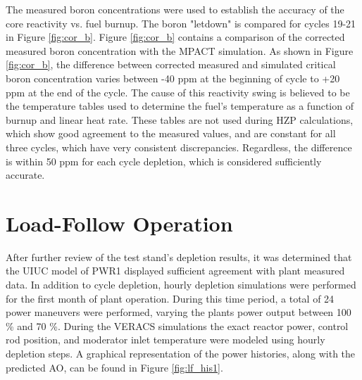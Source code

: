 \documentclass[edeposit,fullpage,11pt]{uiucthesis2009}
\begin{document}
The measured boron concentrations were used to establish the accuracy of the core reactivity vs. fuel burnup. 
The boron "letdown" is compared for cycles 19-21 in Figure \ref{fig:cor_b}. 
Figure \ref{fig:cor_b} contains a comparison of the corrected measured boron concentration with the MPACT simulation. 
As shown in Figure \ref{fig:cor_b}, the difference between corrected measured and simulated critical boron concentration varies between -40 ppm at the beginning of cycle to +20 ppm at the end of the cycle. 
The cause of this reactivity swing is believed to be the temperature tables used to determine the fuel's temperature as a function of burnup and linear heat rate.
These tables are not used during \gls{HZP} calculations, which show good agreement to the measured values, and are constant for all three cycles, which have very consistent discrepancies.
Regardless, the difference is within 50 ppm for each cycle depletion, which is considered sufficiently accurate.

\section{Load-Follow Operation}

After further review of the test stand's depletion results, it was determined that the \gls{UIUC} model of PWR1 displayed sufficient agreement with plant measured data. 
In addition to cycle depletion, hourly depletion simulations were performed for the first month of plant operation.
During this time period, a total of 24 power maneuvers were performed, varying the plants power output between 100 \% and 70 \%.
During the \gls{VERACS} simulations the exact reactor power, control rod position, and moderator inlet temperature were modeled using hourly depletion steps.
A graphical representation of the power histories, along with the predicted \gls{AO}, can be found in Figure \ref{fig:lf_his1}.
\end{document}
